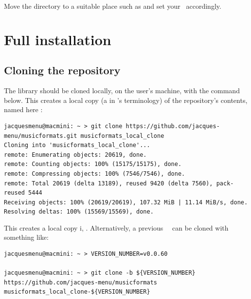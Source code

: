 Move the  directory to a suitable place such as  and set your  \environmentVariable\ accordingly.


\chapter{Full installation}

\section{Cloning the repository}

The library should be cloned locally, on the user's machine, with the command below. This creates a local copy (a  in \git's terminology) of the repository's contents, named here :
\begin{lstlisting}[language=Terminal]
jacquesmenu@macmini: ~ > git clone https://github.com/jacques-menu/musicformats.git musicformats_local_clone
Cloning into 'musicformats_local_clone'...
remote: Enumerating objects: 20619, done.
remote: Counting objects: 100% (15175/15175), done.
remote: Compressing objects: 100% (7546/7546), done.
remote: Total 20619 (delta 13189), reused 9420 (delta 7560), pack-reused 5444
Receiving objects: 100% (20619/20619), 107.32 MiB | 11.14 MiB/s, done.
Resolving deltas: 100% (15569/15569), done.
\end{lstlisting}

This creates a local copy i, \masterBranch.
Alternatively, a previous \mf\ \version\ can be cloned with something like:
\begin{lstlisting}[language=Terminal]
jacquesmenu@macmini: ~ > VERSION_NUMBER=v0.0.60

jacquesmenu@macmini: ~ > git clone -b ${VERSION_NUMBER} https://github.com/jacques-menu/musicformats musicformats_local_clone-${VERSION_NUMBER}
\end{lstlisting}

